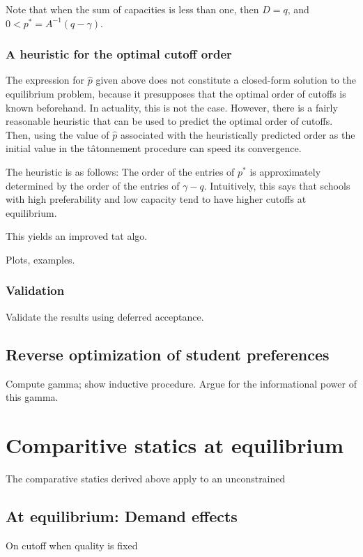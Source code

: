 \documentclass[12pt]{article}
\theoremstyle{definition}
\begin{document}
Note that when the sum of capacities is less than one, then $D = q$, and $0 < p^* = A^{-1} (q - \gamma)$. 

\subsubsection{A heuristic for the optimal cutoff order}
The expression for $\hat p$ given above does not constitute a closed-form solution to the equilibrium problem, because it presupposes that the optimal order of cutoffs is known beforehand. In actuality, this is not the case. However, there is a fairly reasonable heuristic that can be used to predict the optimal order of cutoffs. Then, using the value of $\hat p$ associated with the heuristically predicted order as the initial value in the t\^{a}tonnement procedure can speed its convergence.

The heuristic is as follows: The order of the entries of $p^*$ is approximately determined by the order of the entries of $\gamma - q$. Intuitively, this says that schools with high preferability and low capacity tend to have higher cutoffs at equilibrium.

This yields an improved tat algo.

Plots, examples.

\subsubsection{Validation}
Validate the results using deferred acceptance. 








\subsection{Reverse optimization of student preferences}
Compute gamma; show inductive procedure. Argue for the informational power of this gamma. 



\section{Comparitive statics at equilibrium} \label{compstateq}
The comparative statics derived above apply to an unconstrained 
\subsection{At equilibrium: Demand effects}
On cutoff when quality is fixed
\end{document}

